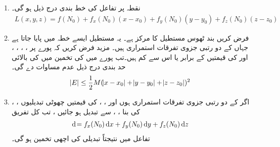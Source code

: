 \begin{enumerate}[1.]
\item
نقطہ  پر تفاعل  کی خط بندی  درج ذیل ہو گی۔
{\small{
\begin{align}\label{مساوات_کثیرالمتغیر_تین_متغیر_تفاعل_تخمین}
L(x,y,z)=f(N_0)+f_x(N_0)(x-x_0)+f_y(N_0)(y-y_0)+f_z(N_0)(z-z_0)
\end{align}
}}
\item
فرض کریں بند  ٹھوس مستطیل   کا مرکز  ہے۔ یہ مستطیل ایسے خطہ میں پایا جاتا ہے جہاں  کے دو رتبی جزوی تفرقات استمراری ہیں۔ مزید فرض کریں کہ پورے  پر ،  ،  ،  ،   اور   کی قیمتیں  کے برابر یا اس سے کم ہیں۔تب پورے  میں    کی تخمین  میں  کی بالائی حد بندی   درج ذیل عدم مساوات دے گی۔
\begin{align}\label{مساوات_کثیرالمتغیر_تین_متغیر_تفاعل_خلل}
\abs{E}\le \frac{1}{2}M(\abs{x-x_0}+\abs{y-y_0}+\abs{z-z_0})^2
\end{align} 
\item
اگر  کے  دو رتبی جزوی تفرقات استمراری ہوں اور ، ،  کی قیمتیں  چھوٹی تبدیلیوں ، ،  کی بنا  ، ،  سے تبدیل ہو جائیں ، تب کل  تفریق
\begin{align*}
\dif =f_x(N_0)\dif x+f_y(N_0)\dif y+f_z(N_0)\dif z
\end{align*}
تفاعل  میں نتیجتاً تبدیلی کی اچھی تخمین ہو گی۔
\end{enumerate}

